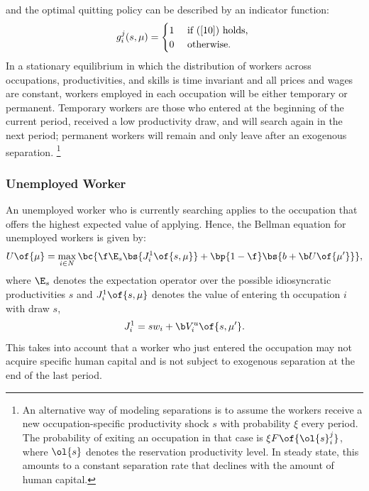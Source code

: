 \documentclass[12pt]{article}
\theoremstyle{definition}
\begin{document}
and the optimal quitting policy can be described by an indicator function:
\begin{equation}
    \label{11}
    g_i^j(s, \mu)= \begin{cases}1 & \text { if }(\ref{10}) \text { holds, } \\ 0 & \text { otherwise. }\end{cases}
\end{equation}
In a stationary equilibrium in which the distribution of workers across occupations, productivities, and skills is time invariant and all prices and wages are constant, workers employed in each occupation will be either temporary or permanent. Temporary workers are those who entered at the beginning of the current period, received a low productivity draw, and will search again in the next period; permanent workers will remain and only leave after an exogenous separation. \footnote{An alternative way of modeling separations is to assume the workers receive a new occupation-specific productivity shock $s$ with probability $\xi$ every period. The probability of exiting an occupation in that case is $\xi F\of{\ol{s}_i^j}$, where $\ol{s}$ denotes the reservation productivity level. In steady state, this amounts to a constant separation rate that declines with the amount of human capital. }

\subsubsection{Unemployed Worker}

An unemployed worker who is currently searching applies to the occupation that offers the highest expected value of applying. Hence, the Bellman equation for unemployed workers is given by:
\begin{equation}
    \label{12}
    U\of{\mu} = \max_{i \in N} \bc{\f \E_s\bs{J_i^1\of{s, \mu}} + \bp{1-\f} \bs{b + \b U\of{\mu^{\prime}}}},
\end{equation}
where $\E_s$ denotes the expectation operator over the possible idiosyncratic productivities $s$ and $J_i^1\of{s, \mu}$ denotes the value of entering th occupation $i$ with draw $s$, 
\begin{equation}
    \label{13}
    J_i^1 = sw_i + \b V_i^u\of{s, \mu^{\prime}}.
\end{equation}
This takes into account that a worker who just entered the occupation may not acquire specific human capital and is not subject to exogenous separation at the end of the last period. 
\end{document}
